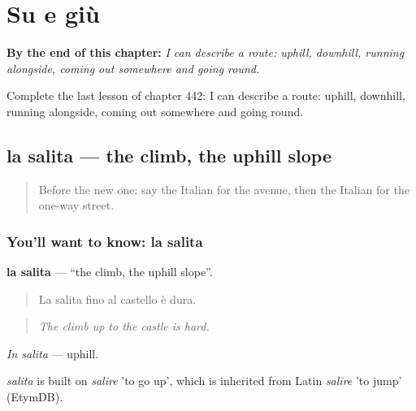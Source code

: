 
\chapter{Su e giù}
\label{ch:it-su-e-giu}

\begin{chapteropening}
\textbf{By the end of this chapter:} \emph{I can describe a route: uphill, downhill, running alongside, coming out somewhere and going round.}

Complete the last lesson of chapter 442: I can describe a route: uphill, downhill, running alongside, coming out somewhere and going round.
\end{chapteropening}

\section[la salita]{la salita — the climb, the uphill slope}

\label{lesson:IT-C442-salita}



\begin{quote}
Before the new one: say the Italian for the avenue, then the Italian for the one-way street.
\end{quote}

\subsection*{You'll want to know: la salita}
\textbf{la salita} — \textquotedblleft{}the climb, the uphill slope\textquotedblright{}.

\begin{quote}
La salita fino al castello è dura.
\end{quote}

\begin{quote}
\emph{The climb up to the castle is hard.}
\end{quote}

\emph{In salita} — uphill.

\begin{cousinweb}
\emph{salita} is built on \emph{salire} 'to go up', which is inherited from Latin \emph{salīre} 'to jump' (EtymDB).
\end{cousinweb}

